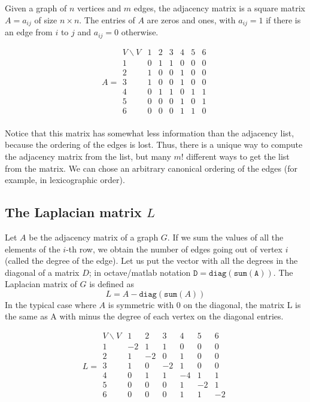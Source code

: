 Given a graph of $n$ vertices and $m$ edges,
the adjacency matrix is a square matrix $A=a_{ij}$ of size $n\times n$.
The entries of $A$ are zeros and ones, with $a_{ij}=1$ if there is an edge
from $i$ to $j$ and $a_{ij}=0$ otherwise.

$$
A =
\begin{array}{l|lllllll}
	V\backslash V
	  & 1 & 2 & 3 & 4 & 5 & 6 \\
	\hline
	1 & 0 & 1 & 1 & 0 & 0 & 0 \\
	2 & 1 & 0 & 0 & 1 & 0 & 0 \\
	3 & 1 & 0 & 0 & 1 & 0 & 0 \\
	4 & 0 & 1 & 1 & 0 & 1 & 1 \\
	5 & 0 & 0 & 0 & 1 & 0 & 1 \\
	6 & 0 & 0 & 0 & 1 & 1 & 0 \\
\end{array}
$$

Notice that this matrix has somewhat less information than the adjacency
list, because the ordering of the edges is lost.  Thus, there is a unique way
to compute the adjacency matrix from the list, but many $m!$ different ways
to get the list from the matrix.  We can chose an arbitrary canonical
ordering of the edges (for example, in lexicographic order).


\subsection{The Laplacian matrix $L$}


Let $A$ be the adjacency matrix of a graph $G$.
If we sum the values of all the elements of the $i$-th row, we obtain the
number of edges going out of vertex $i$ (called the degree of the edge).
Let us put the vector with all the degrees in the diagonal of a matrix $D$; in
octave/matlab notation $\mathtt{D=diag(sum(A))}$.
The Laplacian matrix of $G$ is defined as
\[
L = A - \mathtt{diag}(\mathtt{sum}(A))
\]
In the typical case where $A$ is symmetric with 0 on the diagonal, the matrix
L is the same as A with minus the degree of each vertex on the diagonal
entries.

$$
L =
\begin{array}{l|lllllll}
	V\backslash V
	  & 1 & 2 & 3 & 4 & 5 & 6 \\
	\hline
	1 &-2 & 1 & 1 & 0 & 0 & 0 \\
	2 & 1 &-2 & 0 & 1 & 0 & 0 \\
	3 & 1 & 0 &-2 & 1 & 0 & 0 \\
	4 & 0 & 1 & 1 &-4 & 1 & 1 \\
	5 & 0 & 0 & 0 & 1 &-2 & 1 \\
	6 & 0 & 0 & 0 & 1 & 1 &-2 \\
\end{array}
$$


